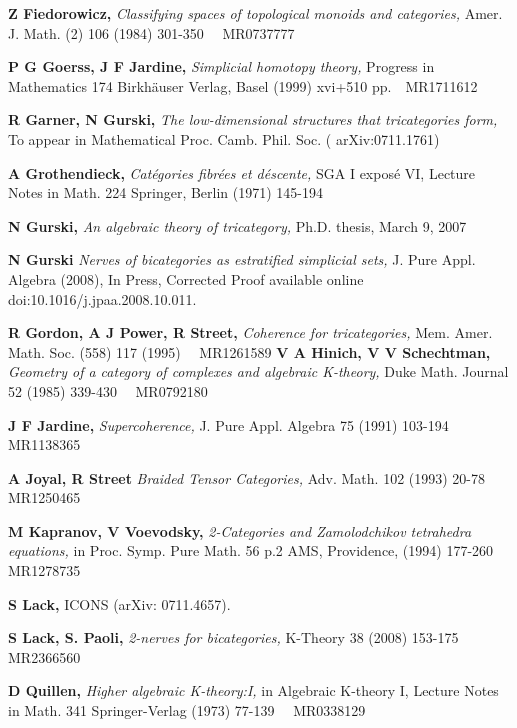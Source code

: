 \documentclass[]{amsart}
\begin{document}
\begin{thebibliography}{99}
 {\bf Z Fiedorowicz,}  \emph{Classifying spaces of topological monoids and categories,}
 Amer. J. Math. (2) 106 (1984) 301-350 \,\,\,\, MR0737777

 {\bf P G Goerss, J F Jardine,} \emph{Simplicial homotopy theory,} Progress in Mathematics
 174 Birkh\"{a}user Verlag, Basel (1999) xvi+510 pp. \,\,\,\,MR1711612

 {\bf R Garner, N  Gurski,}  \emph{ The low-dimensional structures that tricategories form,}
To appear in Mathematical Proc. Camb. Phil. Soc.  ( arXiv:0711.1761)

 {\bf A Grothendieck,}  \emph{ Cat\'{e}gories fibr\'{e}es et d\'{e}scente,} SGA I
expos\'{e} VI, Lecture Notes in Math. 224 Springer, Berlin (1971) 145-194

 {\bf N Gurski,}  \emph{ An algebraic theory of tricategory,} Ph.D. thesis, March 9, 2007

 {\bf N Gurski}  \emph{ Nerves of bicategories as estratified simplicial sets,}
 J. Pure Appl. Algebra (2008), In Press, Corrected Proof available online  doi:10.1016/j.jpaa.2008.10.011.

 {\bf R Gordon, A J   Power, R Street,}  \emph{ Coherence for tricategories,} Mem. Amer.
Math. Soc. (558) 117 (1995) \,\,\,\, MR1261589
 {\bf V A Hinich, V V  Schechtman,}  \emph{ Geometry of a category of complexes and algebraic
K-theory,} Duke Math. Journal 52 (1985) 339-430 \,\,\,\, MR0792180

 {\bf J F Jardine,}  \emph{ Supercoherence,} J. Pure
Appl. Algebra 75  (1991) 103-194 \,\,\,\, MR1138365

  {\bf  A Joyal, R Street}  \emph{ Braided Tensor Categories,} Adv. Math. 102 (1993)
20-78 \,\,\,\, MR1250465

 {\bf M Kapranov, V  Voevodsky,} \emph{ 2-Categories and Zamolodchikov tetrahedra equations,} in
Proc. Symp. Pure Math.  56 p.2  AMS, Providence, (1994) 177-260 \,\,\,\, MR1278735

 {\bf S Lack,} ICONS (arXiv: 0711.4657).

 {\bf S Lack, S.  Paoli,}  \emph{ 2-nerves for bicategories,} K-Theory 38 (2008)
153-175 \,\,\,\, MR2366560

 {\bf D Quillen,}  \emph{ Higher algebraic K-theory:I,} in Algebraic K-theory I, Lecture
Notes in Math. 341 Springer-Verlag  (1973) 77-139 \,\,\,\, MR0338129


\end{thebibliography}
\end{document}

